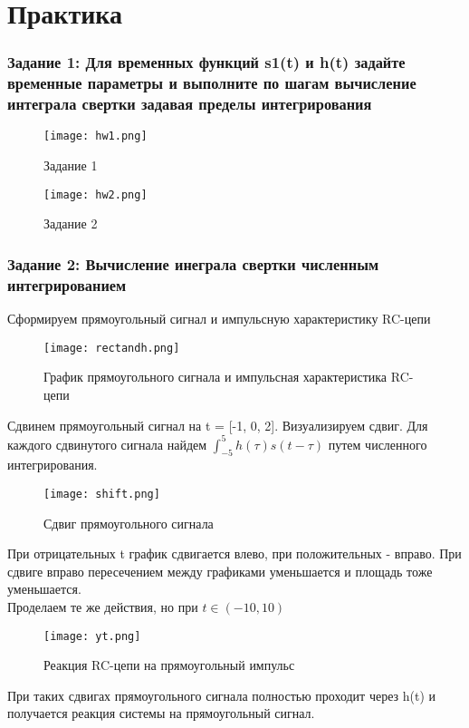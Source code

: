 \chapter{Практика}
\label{ch:chap2}

\subsection*{Задание 1: Для временных функций s1(t) и h(t) задайте временные параметры и выполните по шагам вычисление интеграла свертки задавая пределы интегрирования}

\begin{figure}[H]
    \centering
    \texttt{[image: hw1.png]}
    \caption{Задание 1}
\end{figure}

\begin{figure}[H]
    \centering
    \texttt{[image: hw2.png]}
    \caption{Задание 2}
\end{figure}

\subsection*{Задание 2:  Вычисление инеграла свертки численным интегрированием}

Сформируем прямоугольный сигнал и импульсную характеристику RC-цепи

\begin{figure}[H]
    \centering
    \texttt{[image: rectandh.png]}
    \caption{График прямоугольного сигнала и импульсная характеристика RC-цепи}
\end{figure}

Сдвинем прямоугольный сигнал на t = [-1, 0, 2]. Визуализируем сдвиг. Для каждого сдвинутого сигнала найдем $\int_{-5}^{5}h(\tau)s(t-\tau)$ путем
численного интегрирования.

\begin{figure}[H]
    \centering
    \texttt{[image: shift.png]}
    \caption{Сдвиг прямоугольного сигнала}
\end{figure}

При отрицательных t график сдвигается влево, при положительных - вправо. При сдвиге вправо пересечением между графиками уменьшается
и площадь тоже уменьшается.\\

Проделаем те же действия, но при $t \in (-10, 10)$

\begin{figure}[H]
    \centering
    \texttt{[image: yt.png]}
    \caption{Реакция RC-цепи на прямоугольный импульс}
\end{figure}

При таких сдвигах прямоугольного сигнала полностью проходит через h(t) и получается реакция системы на прямоугольный сигнал.

\endinput
